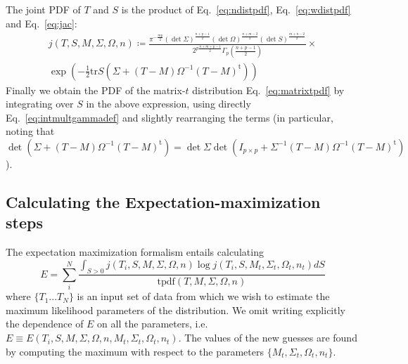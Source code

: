 \documentclass[english,listof=totoc]{scrartcl}
\begin{document}
The joint PDF of $T$ and $S$ is the product of Eq.~\ref{eq:ndistpdf},
Eq.~\ref{eq:wdistpdf} and Eq.~\ref{eq:jac}:
\begin{equation}
\begin{split}j(T,S,M,\Sigma,\Omega,n)\coloneqq\frac{\pi^{-\frac{mp}{2}}(\det\Sigma)^{\frac{n+p-1}{2}}(\det\Omega)^{\frac{n+m-2}{2}}(\det S)^{\frac{m+n-2}{2}}}{2^{p\frac{n+m+p-1}{2}}\Gamma_{p}(\frac{n+p-1}{2})}\times\\
\exp\left(-\frac{1}{2}\textrm{tr}S(\Sigma+(T-M)\Omega^{-1}(T-M)^{\textrm{t}})\right)
\end{split}
\label{eq:jointpdf}
\end{equation}
Finally we obtain the PDF of the matrix-$t$ distribution Eq.~\ref{eq:matrixtpdf}
by integrating over $S$ in the above expression, using directly Eq.~\ref{eq:intmultgammadef}
and slightly rearranging the terms (in particular, noting that $\det(\Sigma+(T-M)\Omega^{-1}(T-M)^{\textrm{t}})=\det\Sigma\det(I_{p\times p}+\Sigma^{-1}(T-M)\Omega^{-1}(T-M)^{\textrm{t}})$).

\subsection{Calculating the Expectation-maximization steps}

The expectation maximization formalism entails calculating 
\begin{equation}
E=\sum_{i}^{N}\frac{\int_{S>0}j(T_{i},S,M,\Sigma,\Omega,n)\log j(T_{i},S,M_{t},\Sigma_{t},\Omega_{t},n_{t})dS}{\textrm{tpdf}(T,M,\Sigma,\Omega,n)}\label{eq:expdef}
\end{equation}
where $\{T_{1}...T_{N}\}$ is an input set of data from which we wish
to estimate the maximum likelihood parameters of the distribution.
We omit writing explicitly the dependence of $E$ on all the parameters,
i.e. $E\equiv E(T_{i},S,M,\Sigma,\Omega,n,M_{t},\Sigma_{t},\Omega_{t},n_{t})$.
The values of the new guesses are found by computing the maximum with
respect to the parameters $\{M_{t},\Sigma_{t},\Omega_{t},n_{t}\}$. 
\end{document}
